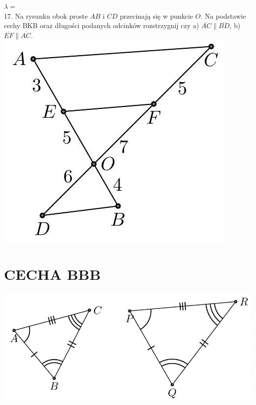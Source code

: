 \documentclass[10pt]{article}
\begin{document}
\(\lambda=\) \(\qquad\)\\
17. Na rysunku obok proste \(A B\) i \(C D\) przecinają się w punkcie \(O\). Na podstawie cechy BKB oraz długości podanych odcinków rozstrzygnij czy a) \(\overline{A C} \| \overline{B D}\), b) \(\overline{E F} \| \overline{A C}\).\\
\includegraphics[max width=\textwidth, center]{2024_11_21_e9b4faa005d5be2cc318g-024(3)}

\section*{CECHA BBB}
\begin{center}
\includegraphics[max width=\textwidth]{2024_11_21_e9b4faa005d5be2cc318g-024(2)}
\end{center}
\end{document}
